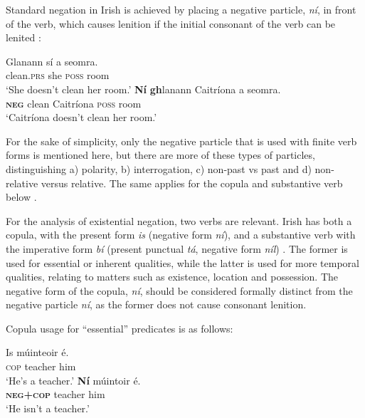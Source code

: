 \documentclass[output=paper,colorlinks,citecolor=brown]{langscibook}
\begin{document}
\begin{paperappendix}
\begin{unindented}

Standard negation in Irish is achieved by placing a negative particle, \textit{ní}, in front of the verb, which causes lenition if the initial consonant of the verb can be lenited \citep[86]{Stenson2008}:
%
\begin{exe}\ex \gll Glanann  sí a seomra. \\
clean.\textsc{prs} she \textsc{poss} room \\
    \glt `She doesn't clean her room.' \citet[86]{Stenson2008}
\ex \gll \textbf{Ní} \textbf{gh}lanann Caitríona a seomra. \\
\textbf{\textsc{neg}} clean Caitríona \textsc{poss} room \\
    \glt `Caitríona doesn't clean her room.' \citet[86]{Stenson2008}
    \end{exe}

For the sake of simplicity, only the negative particle that is used with
finite verb forms is mentioned here, but there are more of these types of
particles, distinguishing a) polarity, b) interrogation, c) non-past vs
past and d) non-relative versus relative. The same applies for the copula
and substantive verb below \parencite[see][93]{Stenson1981}. 

For the analysis of existential negation, two verbs are relevant. Irish has both a copula, with the present form \textit{is} (negative form \textit{ní}), and a substantive verb with the imperative form \textit{bí} (present punctual \textit{tá}, negative form \textit{níl}) \citep[94]{Stenson1981}. The former is used for essential or inherent qualities, while the latter is used for more temporal qualities, relating to matters such as existence, location and possession. The negative form of the copula, \textit{ní}, should be considered formally distinct from the negative particle \textit{ní}, as the former does not cause consonant lenition. 

Copula usage for ``essential'' predicates is as follows:
%
\begin{exe}\ex \gll Is múinteoir é.  \\
\textsc{cop} teacher him \\
    \glt `He's a teacher.' \citep[132]{Stenson1981}
\ex \gll \textbf{Ní} múintoir é.  \\
\textbf{\textsc{neg+cop}} teacher   him \\
    \glt `He isn't a teacher.' \citep[132]{Stenson1981}
    \end{exe}


\end{unindented}
\end{paperappendix}
\end{document}
